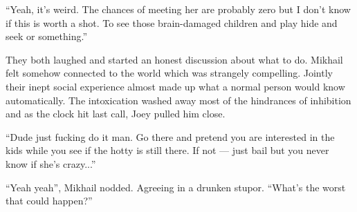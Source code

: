 “Yeah, it’s weird. The chances of meeting her are probably zero but I don’t know if this is worth a shot. To see those brain-damaged children and play hide and seek or something.”

They both laughed and started an honest discussion about what to do. Mikhail felt somehow connected to the world which was strangely compelling. Jointly their inept social experience almost made up what a normal person would know automatically. The intoxication washed away most of the hindrances of inhibition and as the clock hit last call, Joey pulled him close.

“Dude just fucking do it man. Go there and pretend you are interested in the kids while you see if the hotty is still there. If not — just bail but you never know if she’s crazy...”

“Yeah yeah”, Mikhail nodded. Agreeing in a drunken stupor. “What’s the worst that could happen?”
